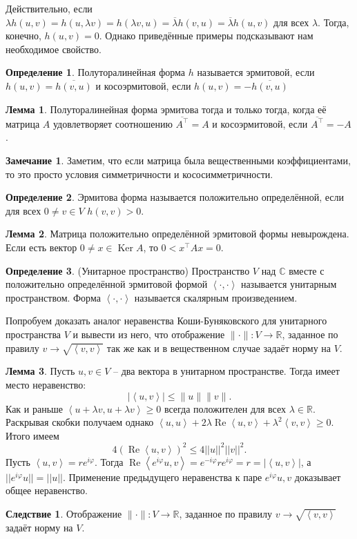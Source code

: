 \documentclass[10pt,a4paper,oneside]{book}
\theoremstyle{definition}
\newtheorem*{rem}{Замечание}
\newtheorem*{defn}{Определение}
\newtheorem{lem}{Лемма}
\newtheorem{cor}{Следствие}
\newcommand{\mb}[1]{\mathbb{#1}}
\newcommand{\ovl}{\overline}
\DeclareMathOperator{\Ker}{Ker}
\renewcommand{\Re}{\operatorname{Re}}
\def\ffi{\varphi}
\def\lan{\left\langle }
\def\ran{\right\rangle}
\def\dfn{\begin{defn}}
\def\edfn{\end{defn}}
\def\lm{\begin{lem}}
\def\elm{\end{lem}}
\def\crl{\begin{cor}}
\def\ecrl{\end{cor}}
\def\rm{\begin{rem}}
\def\erm{\end{rem}}
\begin{document}
Действительно, если $\lambda h(u,v)=h(u,\lambda v) = h(\lambda v,u)=\ovl{\lambda}h(v,u)=\ovl{\lambda}h(u,v)$ для всех $\lambda$. Тогда, конечно, $h(u,v)=0$. Однако приведённые примеры подсказывают нам необходимое свойство.

\dfn Полуторалинейная форма $h$ называется эрмитовой, если $h(u,v)=\ovl{h(v,u)}$ и косоэрмитовой, если $h(u,v)=-\ovl{h(v,u)}$
\edfn

\lm Полуторалинейная форма эрмитова тогда и только тогда, когда её матрица $A$ удовлетворяет соотношению $\ovl{A^{\top}}=A$ и косоэрмитовой, если $\ovl{A^{\top}}=-A$.
\elm

\rm  Заметим, что если матрица была вещественными коэффициентами, то это просто условия  симметричности и кососимметричности.
\erm

\dfn Эрмитова форма называется положительно определённой, если для всех $0\neq v\in V$ $h(v,v)>0$.
\edfn

\lm Матрица положительно определённой эрмитовой формы невырождена.
\proof Если есть вектор $0\neq x\in \Ker A$, то $0<x^{\top}Ax = 0$.
\endproof
\elm

\dfn(Унитарное пространство) Пространство $V$ над $\mb C$ вместе с положительно определённой эрмитовой формой $\lan \cdot, \cdot \ran$ называется унитарным пространством. Форма $\lan \cdot, \cdot \ran$ называется скалярным произведением. 
\edfn

Попробуем доказать аналог неравенства Коши-Буняковского для унитарного пространства $V$ и вывести из него, что отображение $\|\cdot\| \colon V \to \mb R$, заданное по правилу $v\to \sqrt{\lan v,v\ran}$ так же как и в вещественном случае задаёт  норму на $V$.

\lm Пусть $u,v \in V$ -- два вектора в унитарном пространстве. Тогда имеет место неравенство:
$$|\lan u,v\ran| \leq \|u\| \|v\|.$$
\proof Как и раньше  $\lan u+\lambda v, u+\lambda v\ran \geq 0$ всегда положителен для всех $\lambda \in \mb R$. Раскрывая скобки получаем однако $\lan u,u\ran +2\lambda \Re\lan u,v\ran +\lambda^2\lan v,v\ran\geq 0$.  Итого имеем  $$4(\Re\lan u,v\ran)^2 \leq 4 ||u||^2||v||^2.$$
Пусть $\lan u ,v \ran = r e^{i\ffi}$. Тогда $\Re \lan  e^{i\ffi}u , v \ran= e^{-i\ffi} r e^{i\ffi}=r=|\lan u,v\ran|$, а $||e^{i\ffi}u||=||u||$. Применение предыдущего неравенства  к паре $e^{i\ffi} u, v$ доказывает общее неравенство.
\endproof
\elm

\crl Отображение $\|\cdot\| \colon V \to \mb R$, заданное по правилу $v\to \sqrt{\lan v,v\ran}$ задаёт  норму на $V$.
\ecrl
\end{document}
